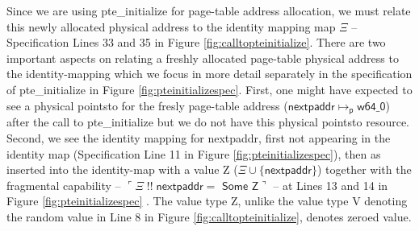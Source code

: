 Since we are using \textsf{pte\_initialize} for page-table address allocation, we must relate this newly allocated physical address to the identity mapping map $\Xi$ -- Specification Lines 33 and 35 in Figure \ref{fig:calltopteinitialize}. There are two important aspects on relating a freshly allocated page-table physical address to the identity-mapping which we focus in more detail separately in the specification of \textsf{pte\_initialize} in Figure \ref{fig:pteinitializespec}. First, one might have expected to see a physical pointsto for the fresly page-table address  ($\mathsf{nextpaddr} \mapsto_{\mathsf{p}} \mathsf{w64\_0}$) after the call to \textsf{pte\_initialize} but we do not have this physical pointsto resource. Second, we see the identity mapping for \textsf{nextpaddr}, first not appearing in the identity map (Specification Line 11 in Figure \ref{fig:pteinitializespec}), then as inserted into the identity-map with a value \textsf{Z} ($\Xi \cup \{\mathsf{nextpaddr}\}$) together with the fragmental capability  -- $\ulcorner \Xi \; !!\; \textsf{nextpaddr} = \textsf{ Some Z} \urcorner$ -- at Lines 13 and 14 in Figure \ref{fig:pteinitializespec} . The value type \textsf{Z}, unlike the value type \textsf{V} denoting the random value in Line 8 in Figure \ref{fig:calltopteinitialize}, denotes \textsf{zeroed} value.

